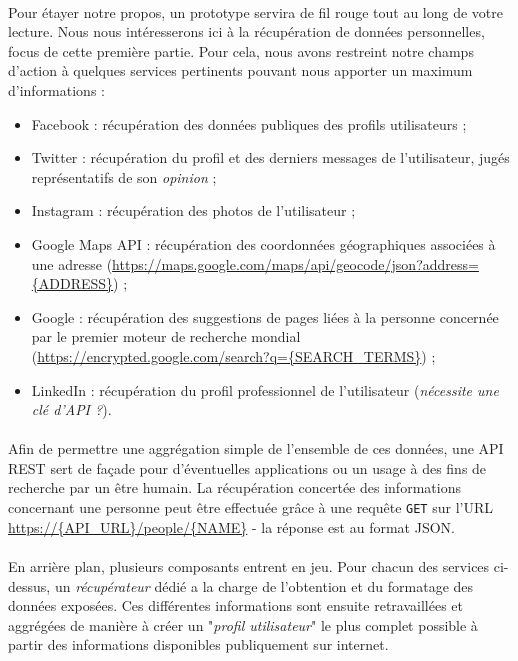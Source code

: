 \paragraph{} Pour étayer notre propos, un prototype servira de fil rouge tout au
long de votre lecture. Nous nous intéresserons ici à la récupération de données personnelles,
focus de cette première partie. Pour cela, nous avons restreint notre champs d'action à quelques
services pertinents pouvant nous apporter un maximum d'informations :

\begin{itemize}
    \item Facebook : récupération des données publiques des profils utilisateurs ;
    \item Twitter : récupération du profil et des derniers messages de l'utilisateur, jugés
    représentatifs de son \emph{opinion} ;
    \item Instagram : récupération des photos de l'utilisateur ; 
    \item Google Maps API : récupération des coordonnées géographiques associées à une adresse
    (\url{https://maps.google.com/maps/api/geocode/json?address={ADDRESS}}) ;
    \item Google : récupération des suggestions de pages liées à la personne concernée par le
    premier moteur de recherche mondial (\url{https://encrypted.google.com/search?q={SEARCH_TERMS}}) ;
    \item LinkedIn : récupération du profil professionnel de l'utilisateur (\emph{nécessite une clé d'API ?}).
\end{itemize}

\paragraph{} Afin de permettre une aggrégation simple de l'ensemble de ces données, une 
API REST sert de façade pour d'éventuelles applications ou un usage à des fins de recherche
par un être humain. La récupération concertée des informations concernant une personne peut
être effectuée grâce à une requête \lstinline{GET} sur l'URL \url{https://{API_URL}/people/{NAME}}
- la réponse est au format JSON.

\paragraph{} En arrière plan, plusieurs composants entrent en jeu. Pour chacun des services
ci-dessus, un \emph{récupérateur} dédié a la charge de l'obtention et du formatage des données
exposées. Ces différentes informations sont ensuite retravaillées et aggrégées de manière 
à créer un "\emph{profil utilisateur}" le plus complet possible à partir des informations
disponibles publiquement sur internet.

